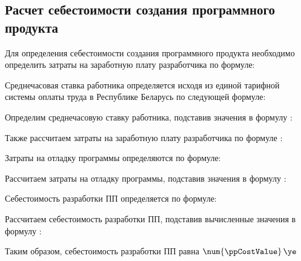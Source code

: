 \subsection{Расчет себестоимости создания программного продукта}
\label{sec:economics:pppurecost}

Для определения себестоимости создания программного продукта необходимо определить затраты на заработную плату разработчика по формуле:
\developerHourPriceEquation

Среднечасовая ставка работника определяется исходя из единой тарифной системы оплаты труда в Республике Беларусь по следующей формуле:
\developerHourRateEquation

Определим среднечасовую ставку работника, подставив значения в формулу :
\developerHourRateFormulaApplied

Также рассчитаем затраты на заработную плату разработчика по формуле :
\developerHourPriceFormulaApplied

Затраты на отладку программы определяются по формуле:
\softwareDebugCostEquation

Рассчитаем затраты на отладку программы, подставив значения в формулу :
\softwareDebugCostFormulaApplied

Себестоимость разработки ПП определяется по формуле:
\ppCostEquation

Рассчитаем себестоимость разработки ПП, подставив вычисленные значения в формулу :
\ppCostFormulaApplied

Таким образом, себестоимость разработки ПП равна \(\num{\ppCostValue} \, \ye\)